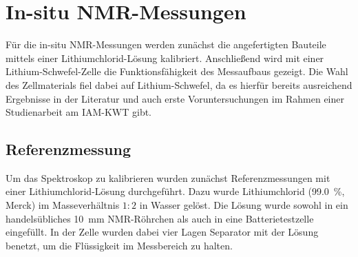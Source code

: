 \documentclass[a4paper, 11pt, headsepline,footsepline,twoside,abstract]{scrbook}
\begin{document}
\section{In-situ NMR-Messungen}
Für die in-situ NMR-Messungen werden zunächst die angefertigten Bauteile mittels einer Lithiumchlorid-Lösung kalibriert. Anschließend wird mit einer Lithium-Schwefel-Zelle die Funktionsfähigkeit des Messaufbaus gezeigt. Die Wahl des Zellmaterials fiel dabei auf Lithium-Schwefel, da es hierfür bereits ausreichend Ergebnisse in der Literatur und auch erste Voruntersuchungen im Rahmen einer Studienarbeit am IAM-KWT gibt.
\subsection{Referenzmessung}
Um das Spektroskop zu kalibrieren wurden zunächst Referenzmessungen mit einer Lithium\-chlorid-Lösung durchgeführt. Dazu wurde Lithiumchlorid (\SI{99.0}{\percent}, Merck) im Masseverhältnis $1:2$ in Wasser gelöst. Die Lösung wurde sowohl in ein handelsübliches \SI{10}{\milli\metre} NMR-Röhrchen als auch in eine Batterietestzelle eingefüllt. In der Zelle wurden dabei vier Lagen Separator mit der Lösung benetzt, um die Flüssigkeit im Messbereich zu halten.
\end{document}
